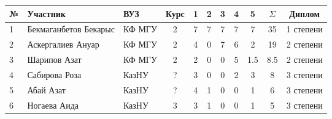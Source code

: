 \begin{center}
\begin{tabular}{|l|l|l|c|c|c|c|c|c|c|c|}
\hline
№ & Участник & ВУЗ & Курс & 1 & 2 & 3 & 4 & 5  & $\Sigma$ & Диплом \\
\hline
1 & Бекмаганбетов Бекарыс & КФ МГУ & 2 & 7 & 7 & 7 & 7 & 7 & 35 & 1 степени \\
\hline
2 & Аскергалиев Ануар & КФ МГУ & 2 & 4 & 0 & 7 & 6 & 2 & 19 & 2 степени \\
\hline
3 & Шарипов Азат & КФ МГУ & 2 & 2 & 0 & 0 & 5 & 1.5 & 8.5 & 2 степени \\
\hline
4 & Сабирова Роза & КазНУ & ? & 3 & 0 & 0 & 2 & 3 & 8 & 3 степени \\
\hline
5 & Абай Азат & КазНУ & ? & 4 & 1 & 0 & 0 & 1 & 6 & 3 степени \\
\hline
6 & Ногаева Аида & КазНУ & 3 & 3 & 1 & 0 & 0 & 1 & 5 & 3 степени \\
\hline
\end{tabular}
\end{center}
